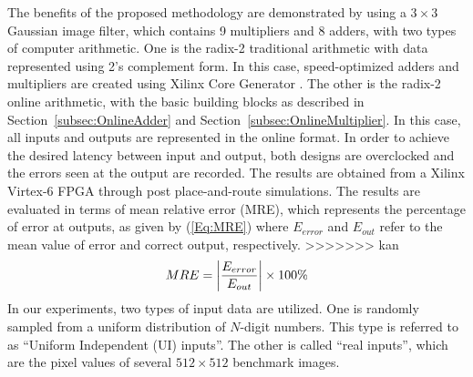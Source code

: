 \documentclass{acm_proc_article-sp}
\begin{document}
The benefits of the proposed methodology are demonstrated by using a $3\times3$ Gaussian image filter, which contains 9 multipliers and 8 adders, with two types of computer arithmetic. One is the radix-2 traditional arithmetic with data represented using 2's complement form. In this case, speed-optimized adders and multipliers are created using Xilinx Core Generator \cite{XilinxMult}. The other is the radix-2 online arithmetic, with the basic building blocks as described in Section~\ref{subsec:OnlineAdder} and Section~\ref{subsec:OnlineMultiplier}. In this case, all inputs and outputs are represented in the online format. In order to achieve the desired latency between input and output, both designs are overclocked and the errors seen at the output are recorded. The results are obtained from a Xilinx Virtex-6 FPGA through post place-and-route simulations. The results are evaluated in terms of mean relative error (MRE), which represents the percentage of error at outputs, as given by (\ref{Eq:MRE}) where $E_{error}$ and $E_{out}$ refer to the mean value of error and correct output, respectively.
>>>>>>> kan
%
\begin{eqnarray}\label{Eq:MRE}
\scriptsize
  MRE=\left|\frac{E_{error}}{E_{out}}\right|\times100\%
\end{eqnarray}
\normalsize
%
In our experiments, two types of input data are utilized. One is randomly sampled from a uniform distribution of $N$-digit numbers. This type is referred to as ``Uniform Independent (UI) inputs''. The other is called ``real inputs'', which are the pixel values of several $512\times512$ benchmark images.

\vspace{-1ex}
\end{document}
